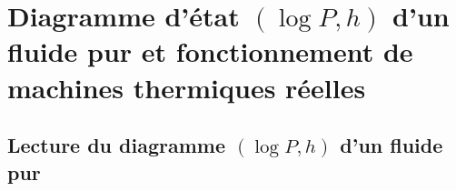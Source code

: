 \section{Diagramme d'état $(\log P,h)$ d'un fluide pur et fonctionnement de machines thermiques réelles}

    \subsection{Lecture du diagramme $(\log P,h)$ d'un fluide pur}